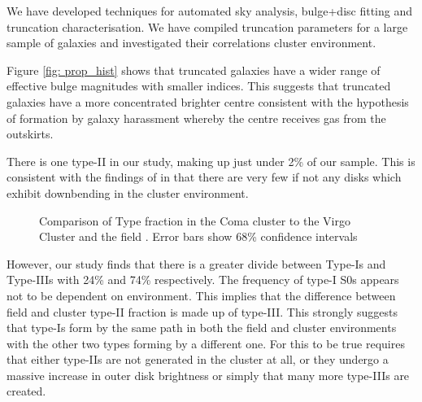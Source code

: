 
We have developed techniques for automated sky analysis, bulge+disc fitting and truncation characterisation. We have compiled truncation parameters for a large sample of galaxies and investigated their correlations cluster environment. 

Figure \ref{fig: prop_hist} shows that truncated galaxies have a wider range of effective bulge magnitudes with smaller \sersic indices. This suggests that truncated galaxies have a more concentrated brighter centre consistent with the hypothesis of formation by galaxy harassment whereby the centre receives gas from the outskirts.

There is one type-II in our study, making up just under 2\% of our sample. This is consistent with the findings of \citet{erwin_strong_2012} in that there are very few if not any disks which exhibit downbending in the cluster environment. 
\begin{figure}[h]
	\centering
	\caption{Comparison of Type fraction in the Coma cluster to the Virgo Cluster and the field \citep{erwin_strong_2012}. Error bars show 68\% confidence intervals \citep{wilson_probable_1927}}
\end{figure}
However, our study finds that there is a greater divide between Type-Is and Type-IIIs with 24\% and 74\% respectively. The frequency of type-I S0s appears not to be dependent on environment. This implies that the difference between field and cluster type-II fraction is made up of type-III. This strongly suggests that type-Is form by the same path in both the field and cluster environments with the other two types forming by a different one. For this to be true requires that either type-IIs are not generated in the cluster at all, or they undergo a massive increase in outer disk brightness or simply that many more type-IIIs are created. 

